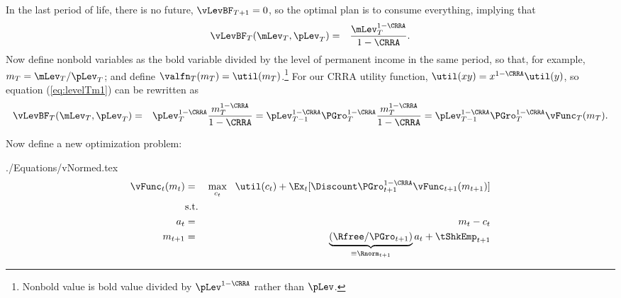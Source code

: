 \documentclass[titlepage]{\econtex}
\begin{document}
In the last period of life, there is no
future, $\vLevBF_{T+1} = 0$, so
the optimal plan is to consume everything, implying that
\begin{eqnarray}
        \vLevBF_{T}(\mLev_{T},\pLev_{T}) & = & \frac{\mLev_{T}^{1-\CRRA}}{1-\CRRA}. \label{eq:levelTm1}
\end{eqnarray}
Now define nonbold variables as the bold variable divided by
the level of permanent income in the same period, so that, for
example, ${m}_{T}=\mLev_{T}/\pLev_{T}$; and define
 $\valfn_{T}({m}_{T}) = \util({m}_{T})$.\footnote{Nonbold value is bold value divided by $\pLev^{1-\CRRA}$ rather than $\pLev$.}  For our CRRA utility function, $\util(xy)=x^{1-\CRRA}\util(y)$, so equation (\ref{eq:levelTm1}) can be
rewritten as
\begin{eqnarray*}
        \vLevBF_{T}(\mLev_{T},\pLev_{T}) & = & \pLev_{T}^{1-\CRRA}\frac{{m}_{T}^{1-\CRRA}}{1-\CRRA} = \pLev_{T-1}^{1-\CRRA}\PGro_{T}^{1-\CRRA}\frac{{m}_{T}^{1-\CRRA}}{1-\CRRA}  = \pLev_{T-1}^{1-\CRRA}\PGro_{T}^{1-\CRRA}\vFunc_{T}({m}_{T}).
\end{eqnarray*}


Now define a new optimization problem:
\begin{verbatimwrite}{./Equations/vNormed.tex}
\begin{eqnarray}
        \null{\vFunc}_{t}({m}_{t}) & = & \max_{{c}_{t}} ~~ \util({c}_{t})+
        \Ex_{t}[{\Discount} \PGro_{t+1}^{1-\CRRA}\null{\vFunc}_{t+1}({m}_{t+1})] \label{vtNorm}
\\         & \text{s.t.} &   \nonumber \\
    {a}_{t}   & = & {m}_{t}-{c}_{t} \nonumber
\\      {m}_{t+1} & = & \underbrace{\left(\Rfree/\PGro_{t+1}\right)}_{\equiv \Rnorm_{t+1}}{a}_{t}+\tShkEmp_{t+1} \nonumber
\end{eqnarray}
\end{verbatimwrite}

\end{document}
